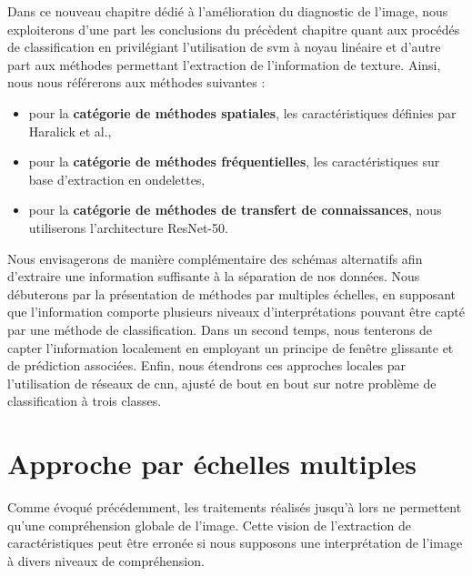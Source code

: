Dans ce nouveau chapitre dédié à l'amélioration du diagnostic de l'image, nous exploiterons d'une part les conclusions du précèdent chapitre quant aux procédés de classification en privilégiant l'utilisation de \gls{svm} à noyau linéaire et d'autre part aux méthodes permettant l'extraction de l'information de texture. Ainsi, nous nous référerons aux méthodes suivantes :
\begin{itemize}
    \item pour la \textbf{catégorie de méthodes spatiales}, les caractéristiques définies par Haralick et al.,
    \item pour la \textbf{catégorie de méthodes fréquentielles}, les caractéristiques sur base d'extraction en ondelettes,
    \item pour la \textbf{catégorie de méthodes de transfert de connaissances}, nous utiliserons l'architecture ResNet-50.
\end{itemize}\par

Nous envisagerons de manière complémentaire des schémas alternatifs afin d'extraire une information suffisante à la séparation de nos données. Nous débuterons par la présentation de méthodes par multiples échelles, en supposant que l'information comporte plusieurs niveaux d'interprétations pouvant être capté par une méthode de classification. Dans un second temps, nous tenterons de capter l'information localement en employant un principe de fenêtre glissante et de prédiction associées. Enfin, nous étendrons ces approches locales par l'utilisation de réseaux de \gls{cnn}, ajusté de bout en bout sur notre problème de classification à trois classes.\par
\clearpage

\section{Approche par échelles multiples}
Comme évoqué précédemment, les traitements réalisés jusqu'à lors ne permettent qu'une compréhension globale de l'image. Cette vision de l'extraction de caractéristiques peut être erronée si nous supposons une interprétation de l'image à divers niveaux de compréhension.\par


